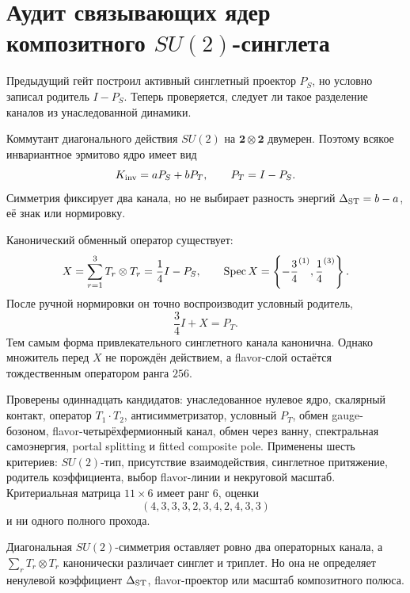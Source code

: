 \chapter{Аудит связывающих ядер композитного
\texorpdfstring{$SU(2)$}{SU(2)}-синглета}
\label{ch:v10-discrete-resolution-su2-singlet-binding-audit}

Предыдущий гейт построил активный синглетный проектор $P_S$, но условно
записал родитель $I-P_S$. Теперь проверяется, следует ли такое разделение
каналов из унаследованной динамики.

Коммутант диагонального действия $SU(2)$ на $\mathbf2\otimes\mathbf2$
двумерен. Поэтому всякое инвариантное эрмитово ядро имеет вид
\begin{equation}
 K_{\rm inv}=aP_S+bP_T,\qquad P_T=I-P_S.
\end{equation}
Симметрия фиксирует два канала, но не выбирает разность энергий
$\Delta_{\rm ST}=b-a$, её знак или нормировку.

Канонический обменный оператор существует:
\begin{equation}
 X=\sum_{r=1}^{3}T_r\otimes T_r
   =\frac14I-P_S,
 \qquad
 \operatorname{Spec} X=\left\{-\frac34^{(1)},\frac14^{(3)}\right\}.
\end{equation}
После ручной нормировки он точно воспроизводит условный родитель,
\begin{equation}
 \frac34I+X=P_T.
\end{equation}
Тем самым форма привлекательного синглетного канала канонична. Однако
множитель перед $X$ не порождён действием, а flavor-слой остаётся
тождественным оператором ранга $256$.

Проверены одиннадцать кандидатов: унаследованное нулевое ядро, скалярный
контакт, оператор $T_1\!\cdot T_2$, антисимметризатор, условный $P_T$,
обмен gauge-бозоном, flavor-четырёхфермионный канал, обмен через ванну,
спектральная самоэнергия, portal splitting и fitted composite pole.
Применены шесть критериев: $SU(2)$-тип, присутствие взаимодействия,
синглетное притяжение, родитель коэффициента, выбор flavor-линии и
некруговой масштаб. Критериальная матрица $11\times6$ имеет ранг $6$,
оценки
\begin{equation}
 (4,3,3,3,2,3,4,2,4,3,3)
\end{equation}
и ни одного полного прохода.

\begin{theorem}
Диагональная $SU(2)$-симметрия оставляет ровно два операторных канала, а
$\sum_rT_r\otimes T_r$ канонически различает синглет и триплет. Но она не
определяет ненулевой коэффициент $\Delta_{\rm ST}$, flavor-проектор или
масштаб композитного полюса.
\end{theorem}

